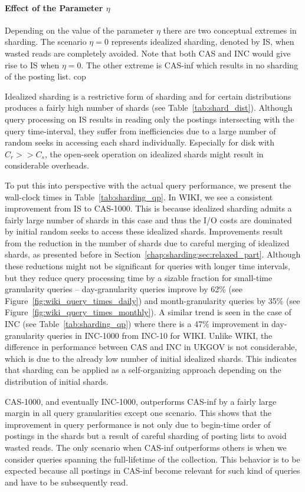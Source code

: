 \paragraph{Effect of the Parameter $\eta$}  Depending on the value of the parameter $\eta$ there are two conceptual extremes in sharding. The scenario $\eta = 0$ represents idealized sharding, denoted by IS, when wasted reads are completely avoided. Note that both CAS and INC would give rise to IS when $\eta = 0$. The other extreme is CAS-inf which results in no sharding of the posting list. cop 

Idealized sharding is a restrictive form of sharding and for certain distributions produces a fairly high number of shards (see Table~\ref{tab:shard_dist}). Although query processing on IS results in reading only the postings intersecting with the query time-interval, they suffer
from inefficiencies due to a large number of random seeks in accessing each shard individually. Especially
for disk with $C_r >> C_s$, the open-seek operation on idealized
shards might result in considerable overheads. 

To put this into perspective with the actual query performance, we present the wall-clock times in Table~\ref{tab:sharding_qp}. In WIKI, we see a consistent improvement from IS to CAS-1000. This is
because idealized sharding admits a fairly large number of shards in
this case and thus the I/O costs are dominated by initial random seeks
to access these idealized shards. Improvements result from the
reduction in the number of shards due to careful merging of idealized
shards, as presented before in Section~\ref{chap:sharding:sec:relaxed_part}. Although
these reductions might not be significant for queries with longer
time intervals, but they reduce query processing time by a sizable
fraction for small-time granularity queries -- day-granularity queries improve by
62\% (see Figure~\ref{fig:wiki_query_times_daily}) and month-granularity queries by
35\% (see Figure~\ref{fig:wiki_query_times_monthly}). A similar trend is seen in the case of INC (see Table~\ref{tab:sharding_qp}) where there is a 47\% improvement in day-granularity queries in INC-1000 from INC-10 for WIKI. Unlike WIKI, the  difference in performance between CAS and INC in UKGOV is not considerable, which is due
to the already low number of initial idealized shards. This indicates
that sharding can be applied as a self-organizing approach
depending on the distribution of initial shards. 

CAS-1000, and eventually INC-1000, outperforms CAS-inf by a fairly large margin in all
query granularities except one scenario. This shows that the improvement in query performance is not only due to begin-time order of postings in the shards but a result of careful sharding of posting lists to avoid wasted reads. The only scenario when CAS-inf outperforms others is when we consider queries spanning the full-lifetime of the collection. This behavior is to be expected because all postings in CAS-inf
become relevant for such kind of queries and have to be subsequently
read. 

